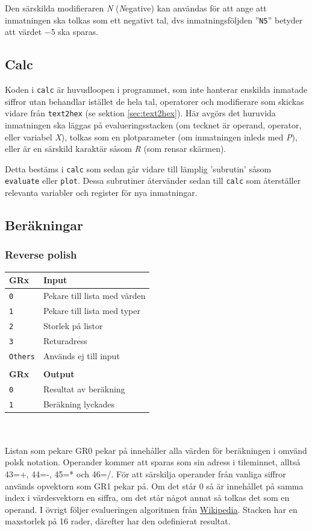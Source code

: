 \documentclass[]{article}
\begin{document}
Den särskilda modifieraren \textit{N} (\textit{N}egative) kan användas för att ange att inmatningen ska tolkas som ett negativt tal, dvs inmatningsföljden ''\texttt{N5}'' betyder att värdet $-5$ ska sparas.

\subsection{Calc}
Koden i \texttt{calc} är huvudloopen i programmet, som inte hanterar enskilda inmatade siffror utan behandlar istället de hela tal, operatorer och modifierare som skickas vidare från \texttt{text2hex} (se sektion \ref{sec:text2hex}). Här avgörs det huruvida inmatningen ska läggas på evalueringsstacken (om tecknet är operand, operator, eller variabel \textit{X}), tolkas som en plotparameter (om inmatningen inleds med \textit{P}), eller är en särskild karaktär såsom \textit{R} (som rensar skärmen).

Detta bestäms i \texttt{calc} som sedan går vidare till lämplig 'subrutin' såsom \texttt{evaluate} eller \texttt{plot}. Dessa subrutiner återvänder sedan till \texttt{calc} som återställer relevanta variabler och register för nya inmatningar.

\subsection{Beräkningar}
\subsubsection{Reverse polish}
\begin{tabular}{ll}
	\textbf{GRx}    & \textbf{Input}               \\ \hline
	\texttt{0}      & Pekare till lista med värden \\
	\texttt{1}      & Pekare till lista med typer  \\
	\texttt{2}      & Storlek på listor            \\
	\texttt{3}      & Returadress                  \\
	\texttt{Others} & Används ej till input        \\
	                &  \\
	\textbf{GRx}    & \textbf{Output}              \\ \hline
	\texttt{0}      & Resultat av beräkning        \\
	\texttt{1}      & Beräkning lyckades
\end{tabular}
\\\\
\noindent
Listan som pekare GR0 pekar på innehåller alla värden för beräkningen i omvänd polsk notation. Operander kommer att sparas som sin adress i tileminnet, alltså 43=+, 44=-, 45=* och 46=/. För att särskilja operander från vanliga siffror används opvektorn som GR1 pekar på. Om det står 0 så är innehållet på samma index i värdesvektorn en siffra, om det står något annat så tolkas det som en operand. I övrigt följer evalueringen algoritmen från \href{https://en.wikipedia.org/wiki/Reverse_Polish_notation#Postfix_algorithm}{Wikipedia}. Stacken har en maxstorlek på 16 rader, därefter har den odefinierat resultat. 
\end{document}
